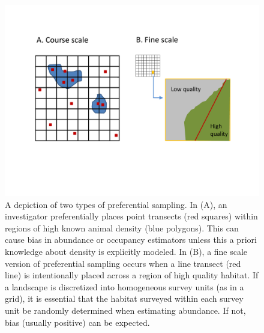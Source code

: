 \documentclass[times,mee,doublespace,]{besauth2}
\begin{document}
\begin{figure} %
\begin{center}
\includegraphics[width=170mm]{Pref_sampling_diag.pdf}
\caption{A depiction of two types of preferential sampling.  In (A), an investigator preferentially places point transects (red squares) within regions of high known animal density (blue polygons).  This can cause bias in abundance or occupancy estimators unless this a priori knowledge about density is explicitly modeled.  In (B), a fine scale version of preferential sampling occurs when a line transect (red line) is intentionally placed across a region of high quality habitat.  If a landscape is discretized into homogeneous survey units (as in a grid), it is essential that the habitat surveyed within each survey unit be randomly determined when estimating abundance.  If not, bias (usually positive) can be expected.}
\label{fig:pref}
\end{center}
\end{figure}
\end{document}
